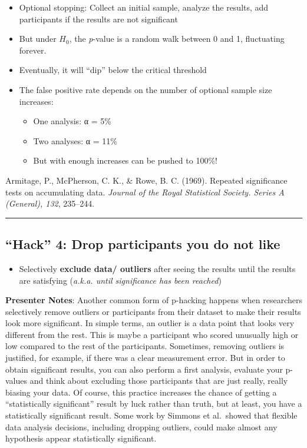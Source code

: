 \documentclass[
  english,
  letterpaper,
  DIV=11,
  numbers=noendperiod]{scrartcl}
\providecommand{\tightlist}{%
  \setlength{\itemsep}{0pt}\setlength{\parskip}{0pt}}
\begin{document}
\begin{itemize}
\tightlist
\item
  Optional stopping: Collect an initial sample, analyze the results, add
  participants if the results are not significant
\item
  But under \(H_0\), the \emph{p}-value is a random walk between 0 and
  1, fluctuating forever.
\item
  Eventually, it will ``dip'' below the critical threshold
\item
  The false positive rate depends on the number of optional sample size
  increases:

  \begin{itemize}
  \tightlist
  \item
    One analysis: α = 5\%
  \item
    Two analyses: α = 11\%
  \item
    But with enough increases can be pushed to 100\%!
  \end{itemize}
\end{itemize}

Armitage, P., McPherson, C. K., \& Rowe, B. C. (1969). Repeated
significance tests on accumulating data. \emph{Journal of the Royal
Statistical Society. Series A (General), 132}, 235--244.

\begin{center}\rule{0.5\linewidth}{0.5pt}\end{center}

\subsection{``Hack'' 4: Drop participants you do not
like}\label{hack-4-drop-participants-you-do-not-like}

\begin{itemize}
\tightlist
\item
  Selectively \textbf{exclude data/ outliers} after seeing the results
  until the results are satisfying (\emph{a.k.a. until significance has
  been reached})
\end{itemize}

\textbf{Presenter Notes}: Another common form of p-hacking happens when
researchers selectively remove outliers or participants from their
dataset to make their results look more significant. In simple terms, an
outlier is a data point that looks very different from the rest. This is
maybe a participant who scored unusually high or low compared to the
rest of the participants. Sometimes, removing outliers is justified, for
example, if there was a clear measurement error. But in order to obtain
significant results, you can also perform a first analysis, evaluate
your p-values and think about excluding those participants that are just
really, really biasing your data. Of course, this practice increases the
chance of getting a ``statistically significant'' result by luck rather
than truth, but at least, you have a statistically significant result.
Some work by Simmons et al.~showed that flexible data analysis
decisions, including dropping outliers, could make almost any hypothesis
appear statistically significant.
\end{document}
